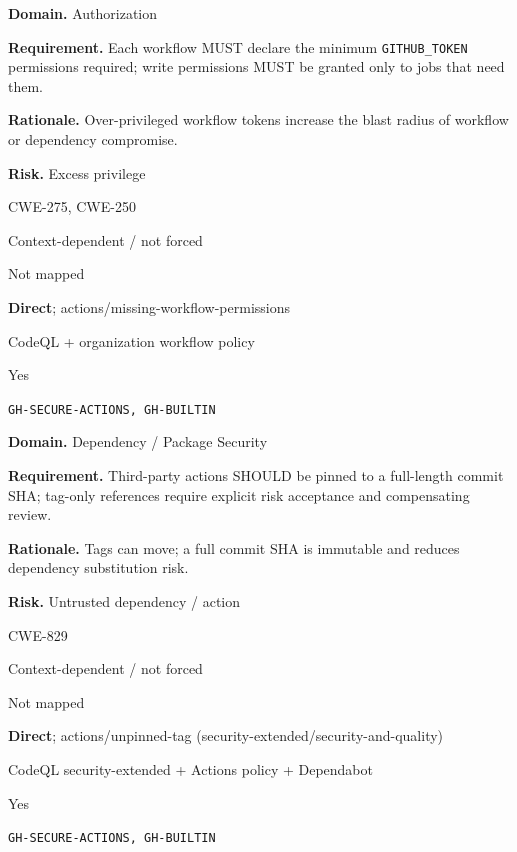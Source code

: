 \documentclass[10pt,letterpaper]{article}
\newcommand{\code}[1]{\texttt{\small #1}}
\newcommand{\prioritybadge}[2]{\tcbox[on line,boxrule=0pt,arc=1.2mm,boxsep=0.7mm,left=1mm,right=1mm,top=0.4mm,bottom=0.4mm,colback=#2!12,coltext=#2]{\scriptsize\bfseries #1}}
\begin{document}
\begin{rulebox}[title={\texttt{SCS-ACTIONS-AUTHZ-001} \hfill \prioritybadge{Critical Control}{Critical}}]
\textbf{Domain.} Authorization

\textbf{Requirement.} Each workflow MUST declare the minimum \code{GITHUB\_TOKEN} permissions required; write permissions MUST be granted only to jobs that need them.

\textbf{Rationale.} Over-privileged workflow tokens increase the blast radius of workflow or dependency compromise.

\textbf{Risk.} Excess privilege

\begin{description}[leftmargin=2.65cm,labelwidth=2.3cm,style=nextline,itemsep=1pt,topsep=3pt]
  \item[CWE] CWE-275, CWE-250
  \item[OWASP] Context-dependent / not forced
  \item[CERT] Not mapped
  \item[CodeQL] \textbf{Direct}; actions/missing-workflow-permissions
  \item[Enforcement] CodeQL + organization workflow policy
  \item[Automation] Yes
  \item[Sources] \texttt{GH-SECURE-ACTIONS, GH-BUILTIN}
\end{description}
\end{rulebox}

\begin{rulebox}[title={\texttt{SCS-ACTIONS-DEP-001} \hfill \prioritybadge{Critical Control}{Critical}}]
\textbf{Domain.} Dependency / Package Security

\textbf{Requirement.} Third-party actions SHOULD be pinned to a full-length commit SHA; tag-only references require explicit risk acceptance and compensating review.

\textbf{Rationale.} Tags can move; a full commit SHA is immutable and reduces dependency substitution risk.

\textbf{Risk.} Untrusted dependency / action

\begin{description}[leftmargin=2.65cm,labelwidth=2.3cm,style=nextline,itemsep=1pt,topsep=3pt]
  \item[CWE] CWE-829
  \item[OWASP] Context-dependent / not forced
  \item[CERT] Not mapped
  \item[CodeQL] \textbf{Direct}; actions/\allowbreak unpinned-tag (security-extended/\allowbreak security-and-quality)
  \item[Enforcement] CodeQL security-extended + Actions policy + Dependabot
  \item[Automation] Yes
  \item[Sources] \texttt{GH-SECURE-ACTIONS, GH-BUILTIN}
\end{description}
\end{rulebox}
\end{document}
